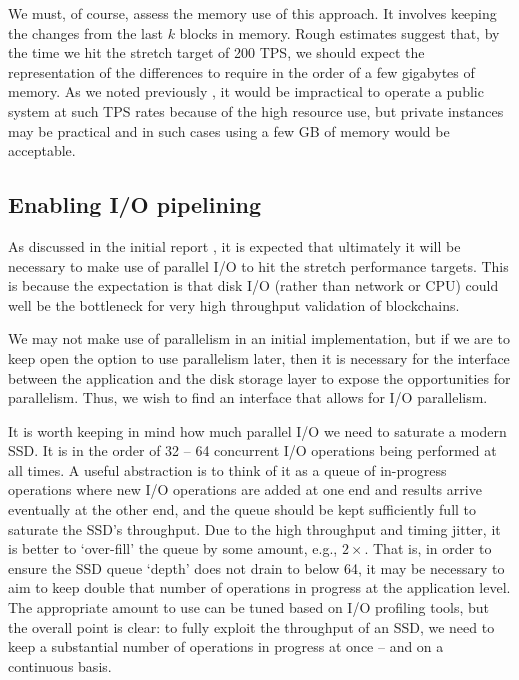 \documentclass[11pt,a4paper]{article}
\begin{document}
We must, of course, assess the memory use of this approach. It involves keeping
the changes from the last $k$ blocks in memory. Rough estimates suggest that, by
the time we hit the stretch target of 200 TPS, we should expect the
representation of the differences to require in the order of a few gigabytes of
memory. As we noted previously \citep[section 3.3.5]{utxo-db}, it would be
impractical to operate a public system at such TPS rates because of the high
resource use, but private instances may be practical and in such cases using a
few GB of memory would be acceptable.


\subsection{Enabling I/O pipelining}
\label{enabling-pipelining}

As discussed in the initial report \citep[sections 6.1 and 8.8]{utxo-db}, it is
expected that ultimately it will be necessary to make use of parallel I/O to
hit the stretch performance targets. This is because the expectation is that
disk I/O (rather than network or CPU) could well be the bottleneck for very
high throughput validation of blockchains.

We may not make use of parallelism in an initial implementation, but if we are
to keep open the option to use parallelism later, then it is necessary for the
interface between the application and the disk storage layer to expose the
opportunities for parallelism. Thus, we wish to find an interface that allows
for I/O parallelism.

It is worth keeping in mind how much parallel I/O we need to saturate a modern
SSD. It is in the order of 32 -- 64 concurrent I/O operations being performed
at all times. A useful abstraction is to think of it as a queue of in-progress
operations where new I/O operations are added at one end and results arrive
eventually at the other end, and the queue should be kept sufficiently full to
saturate the SSD's throughput. Due to the high throughput and timing jitter, it
is better to `over-fill' the queue by some amount, e.g., $2\times$. That is, in
order to ensure the SSD queue `depth' does not drain to below 64, it may be necessary to aim to keep double that number of
operations in progress at the application level. The appropriate amount to use can be tuned based on I/O
profiling tools, but the overall point is clear: to fully exploit the
throughput of an SSD, we need to keep a substantial number of operations in
progress at once -- and on a continuous basis.
\end{document}
